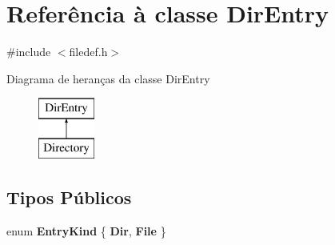 \hypertarget{class_dir_entry}{\section{Referência à classe Dir\-Entry}
\label{class_dir_entry}
}


{\ttfamily \#include $<$filedef.\-h$>$}

Diagrama de heranças da classe Dir\-Entry\begin{figure}[H]
\begin{center}
\leavevmode
\includegraphics[height=2.000000cm]{class_dir_entry}
\end{center}
\end{figure}
\subsection*{Tipos Públicos}
\begin{DoxyCompactItemize}
\item 
enum {\bfseries Entry\-Kind} \{ {\bfseries Dir}, 
{\bfseries File}
 \}
\end{DoxyCompactItemize}
